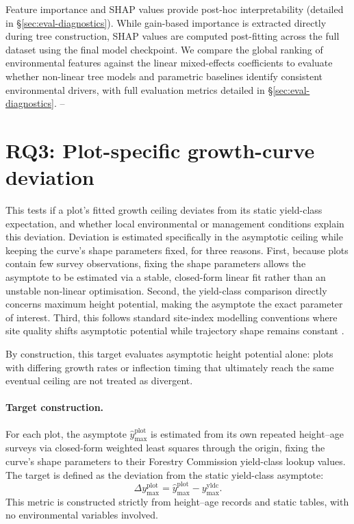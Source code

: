 \documentclass[11pt,a4paper]{report}
\begin{document}
Feature importance and SHAP values provide post-hoc interpretability (detailed in \S\ref{sec:eval-diagnostics}). While gain-based importance is extracted directly during tree construction, SHAP values are computed post-fitting across the full dataset using the final model checkpoint. We compare the global ranking of environmental features against the linear mixed-effects coefficients to evaluate whether non-linear tree models and parametric baselines identify consistent environmental drivers, with full evaluation metrics detailed in \S\ref{sec:eval-diagnostics}. -- %

\section{RQ3: Plot-specific growth-curve deviation}
This tests if a plot's fitted growth ceiling deviates from its static yield-class expectation, and whether local environmental or management conditions explain this deviation. Deviation is estimated specifically in the asymptotic ceiling while keeping the curve's shape parameters fixed, for three reasons. First, because plots contain few survey observations, fixing the shape parameters allows the asymptote to be estimated via a stable, closed-form linear fit rather than an unstable non-linear optimisation. Second, the yield-class comparison directly concerns maximum height potential, making the asymptote the exact parameter of interest. Third, this follows standard site-index modelling conventions where site quality shifts asymptotic potential while trajectory shape remains constant \citep{socha2021Regional_C2_CR}. 

By construction, this target evaluates asymptotic height potential alone: plots with differing growth rates or inflection timing that ultimately reach the same eventual ceiling are not treated as divergent. 

\paragraph*{Target construction.}
For each plot, the asymptote $\hat{y}_{\max}^{\text{plot}}$ is estimated from its own repeated height--age surveys via closed-form weighted least squares through the origin, fixing the curve's shape parameters to their Forestry Commission yield-class lookup values. The target is defined as the deviation from the static yield-class asymptote:
\begin{equation}
\Delta y_{\max}^{\text{plot}} = \hat y_{\max}^{\text{plot}} - y_{\max}^{\text{yldc}}.
\label{eq:local-ymax-diff}
\end{equation}
This metric is constructed strictly from height--age records and static tables, with no environmental variables involved. 
\end{document}
